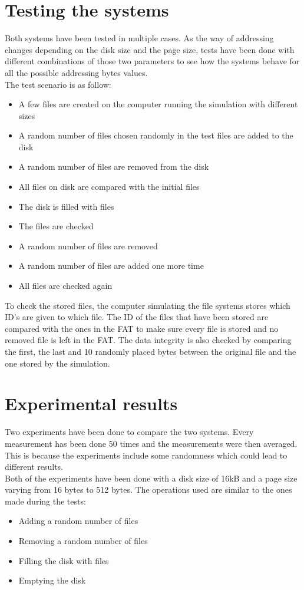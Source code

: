 \documentclass[10pt,a4paper]{ULBreport}
\begin{document}
\chapter{Testing the systems}
Both systems have been tested in multiple cases. As the way of addressing changes depending on the disk size and the page size, tests have been done with different combinations of those two parameters to see how the systems behave for all the possible addressing bytes values.
\vspace{0.5cm}\\
The test scenario is as follow:
\begin{itemize}
    \item A few files are created on the computer running the simulation with different sizes
    \item A random number of files chosen randomly in the test files are added to the disk
    \item A random number of files are removed from the disk
    \item All files on disk are compared with the initial files
    \item The disk is filled with files
    \item The files are checked
    \item A random number of files are removed
    \item A random number of files are added one more time
    \item All files are checked again
\end{itemize}
To check the stored files, the computer simulating the file systems stores which ID's are given to which file. The ID of the files that have been stored are compared with the ones in the FAT to make sure every file is stored and no removed file is left in the FAT. The data integrity is also checked by comparing the first, the last and 10 randomly placed bytes between the original file and the one stored by the simulation.












\chapter{Experimental results}
Two experiments have been done to compare the two systems. Every measurement has been done 50 times and the measurements were then averaged. This is because the experiments include some randomness which could lead to different results. \\
Both of the experiments have been done with a disk size of 16kB and a page size varying from 16 bytes to 512 bytes. The operations used are similar to the ones made during the tests:
\begin{itemize}
    \item Adding a random number of files
    \item Removing a random number of files
    \item Filling the disk with files
    \item Emptying the disk
\end{itemize}
\end{document}
